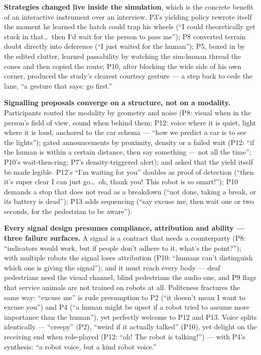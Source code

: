 \textbf{Strategies changed live inside the simulation}, which is the
concrete benefit of an interactive instrument over an interview. P3's
yielding policy rewrote itself the moment he learned the hatch could
trap his wheels (``I could theoretically get stuck in that\dots\ then
I'd wait for the person to pass me''); P8 converted terrain doubt
directly into deference (``I just waited for the human''); P5, boxed in
by the edited clutter, learned passability by watching the sim-human
thread the cones and then copied the route; P10, after blocking the
wide side of his own corner, produced the study's clearest courtesy
gesture --- a step back to cede the lane, ``a gesture that says: go
first.''

\textbf{Signalling proposals converge on a structure, not on a
modality.} Participants routed the modality by geometry and noise (P8:
visual when in the person's field of view, sound when behind them; P12:
voice where it is quiet, light where it is loud, anchored to the car
schema --- ``how we predict a car is to see the lights''); gated
announcements by proximity, density or a failed wait (P12: ``if the
human is within a certain distance, then say something --- not all the
time''; P10's wait-then-ring; P7's density-triggered alert); and asked
that the yield itself be made legible. P12's ``I'm waiting for you''
doubles as proof of detection (``then it's super clear I can just
go\dots\ oh, thank you! This robot is so smart!''); P10 demands a stop
that does not read as a breakdown (``not done, taking a break, or its
battery is dead''); P13 adds sequencing (``say excuse me, then wait one
or two seconds, for the pedestrian to be aware'').

\textbf{Every signal design presumes compliance, attribution and
ability --- three failure surfaces.} A signal is a contract that needs
a counterparty (P8: ``indicators would work, but if people don't adhere
to it, what's the point?''); with multiple robots the signal loses
attribution (P10: ``humans can't distinguish which one is giving the
signal''); and it must reach every body --- deaf pedestrians need the
visual channel, blind pedestrians the audio one, and P9 flags that
service animals are not trained on robots at all. Politeness fractures
the same way: ``excuse me'' is rude presumption to P2 (``it doesn't
mean I want to excuse you'') and P4 (``a human might be upset if a
robot tried to assume more importance than the human''), yet perfectly
welcome to P12 and P13. Voice splits identically --- ``creepy'' (P2),
``weird if it actually talked'' (P10), yet delight on the receiving end
when role-played (P12: ``oh! The robot is talking!'') --- with P4's
synthesis: ``a robot voice, but a kind robot voice.''

